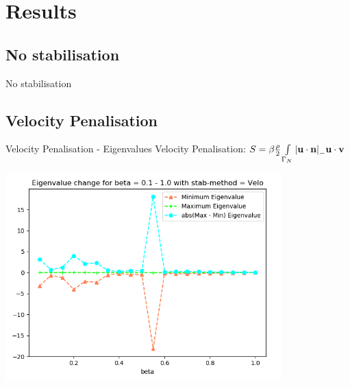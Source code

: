 \section{Results}
\subsection{No stabilisation}
\begin{frame}{No stabilisation}
    \begin{center}
\end{center}
\end{frame}
\subsection{Velocity Penalisation}
\begin{frame}{Velocity Penalisation - Eigenvalues}
Velocity Penalisation:
      \(
      S = \beta\frac{\rho}{2}\int\limits_{\Gamma_{N}} \abs{{\textbf{u}} \cdot {\textbf{n}} }_- {\textbf{u}} \cdot {\textbf{v}}
      \)
    \begin{center}
        \includegraphics[width=0.8\textwidth]{Media/Beta_1_thru_0_velo.png}
    \end{center}
\end{frame}


